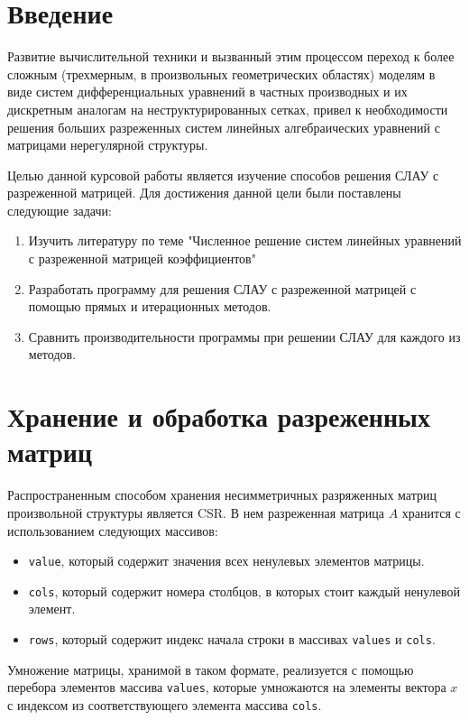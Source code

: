 \documentclass[a4paper, fontsize=14pt]{article}
\begin{document}

\newpage

\tableofcontents

\newpage

\section*{Введение}

Развитие вычислительной техники и вызванный этим процессом переход к более сложным (трехмерным, 
в произвольных геометрических областях) моделям в виде систем дифференциальных уравнений в 
частных производных и их дискретным аналогам на неструктурированных сетках, привел к 
необходимости решения больших разреженных систем линейных алгебраических уравнений с 
матрицами нерегулярной структуры.

Целью данной курсовой работы является изучение способов решения СЛАУ с разреженной матрицей.
Для достижения данной цели были поставлены следующие задачи:
\begin{enumerate}
    \item Изучить литературу по теме "Численное решение систем линейных уравнений с разреженной
        матрицей коэффициентов"
    \item Разработать программу для решения СЛАУ с разреженной матрицей с помощью прямых и
        итерационных методов.
    \item Сравнить производительности программы при решении СЛАУ для каждого из методов.
\end{enumerate}
\newpage
\section{Хранение и обработка разреженных матриц}
Распространенным способом хранения несимметричных разряженных матриц произвольной структуры является
CSR. В нем разреженная матрица $A$ хранится с использованием следующих массивов:
\begin{itemize}
    \item \verb|value|, который содержит значения всех ненулевых элементов матрицы.
    \item \verb|cols|, который содержит номера столбцов, в которых стоит каждый ненулевой элемент.
    \item \verb|rows|, который содержит индекс начала строки в массивах \verb|values| и \verb|cols|.
\end{itemize}
Умножение матрицы, хранимой в таком формате, реализуется с помощью перебора элементов массива
\verb|values|, которые умножаются на элементы вектора $x$ с индексом из соответствующего
элемента массива \verb|cols|.\cite{bal} 
\end{document}
